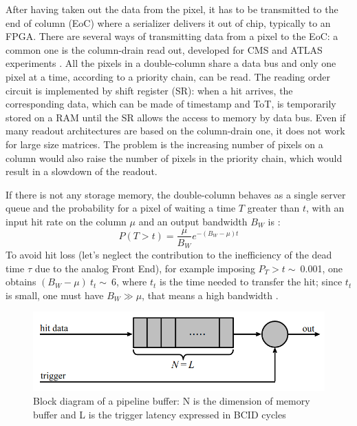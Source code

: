    After having taken out the data from the pixel, it has to be transmitted to the end of column (EoC) where a serializer delivers it out of chip, typically to an FPGA.
   There are several ways of transmitting data from a pixel to the EoC: a common one is the column-drain read out, developed for CMS and ATLAS experiments \cite{column-drain}. 
   All the pixels in a double-column share a data bus and only one pixel at a time, according to a priority chain, can be read. The reading order circuit is implemented by shift register (SR): when a hit arrives, the corresponding data, which can be made of timestamp and ToT, is temporarily stored on a RAM until the SR allows the access to memory by data bus. 
   Even if many readout architectures are based on the column-drain one, it does not work for large size matrices. The problem is the increasing number of pixels on a column would also raise the number of pixels in the priority chain, which would result in a slowdown of the readout. 

   If there is not any storage memory, the double-column behaves as a single server queue and the probability for a pixel of waiting a time $T$ greater than $t$, with an input hit rate on the column $\mu$ and an output bandwidth $B_W$ is \cite{Garcia-Review}:
   \begin{equation}
   P(T > t) = \frac{\mu}{B_W} e^{-( B_W-\mu )t}
   \label{eq:priority_chain_no_buffer}
   \end{equation}
   To avoid hit loss (let's neglect the contribution to the inefficiency of the dead time $\tau$ due to the analog Front End), for example imposing $P_T > t\sim\:$0.001, one obtains $(B_W -\mu)\:t_t\sim\:$6, where $t_t$ is the time needed to transfer the hit; since $t_t$ is small, one must have $B_W \gg \mu$, that means a high bandwidth \cite{Garcia-Review}.
   \begin{figure}[h!]
      \centering
      \includegraphics[width=.6\linewidth]{figures/Pixel_detectors/pipeline.png}
      \caption{Block diagram of a pipeline buffer: N is the dimension of memory buffer and L is the trigger latency expressed in BCID cycles}
      \label{fig:pipeline}
   \end{figure}


